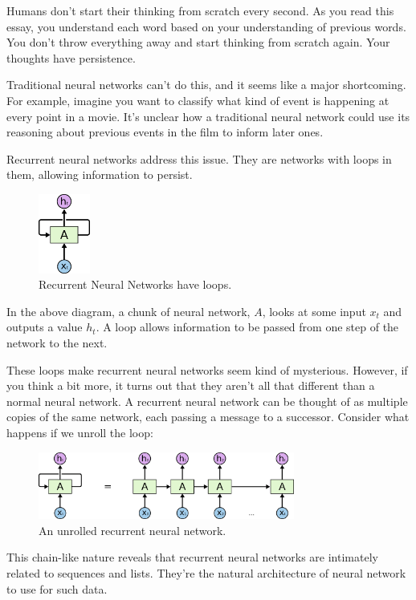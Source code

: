 Humans don’t start their thinking from scratch every second. As you read this essay, you understand each word based on your understanding of previous words. You don’t throw everything away and start thinking from scratch again. Your thoughts have persistence.

Traditional neural networks can’t do this, and it seems like a major shortcoming. For example, imagine you want to classify what kind of event is happening at every point in a movie. It’s unclear how a traditional neural network could use its reasoning about previous events in the film to inform later ones.

Recurrent neural networks address this issue. They are networks with loops in them, allowing information to persist.
\begin{figure}[htbp]
	\centering
	\includegraphics[width=0.15\textwidth]{fig/1.png}
	\caption{Recurrent Neural Networks have loops.}
\end{figure}

In the above diagram, a chunk of neural network, $A$, looks at some input $x_t$ and outputs a value $h_t$. A loop allows information to be passed from one step of the network to the next.

These loops make recurrent neural networks seem kind of mysterious. However, if you think a bit more, it turns out that they aren’t all that different than a normal neural network. A recurrent neural network can be thought of as multiple copies of the same network, each passing a message to a successor. Consider what happens if we unroll the loop:
\begin{figure}[htbp]
	\centering
	\includegraphics[width=0.75\textwidth]{fig/2.png}
	\caption{An unrolled recurrent neural network.}
\end{figure}

This chain-like nature reveals that recurrent neural networks are intimately related to sequences and lists. They’re the natural architecture of neural network to use for such data.

